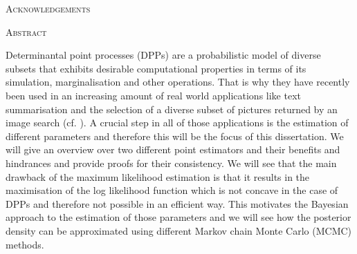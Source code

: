 \begin{center}
{\LARGE\textsc{Acknowledgements}\\[.9cm]}
\begin{minipage}{11cm}
\end{minipage}
\end{center}

\clearpage


\begin{center}
{\LARGE\textsc{Abstract}\\[.9cm]}
\begin{minipage}{11cm}
Determinantal point processes (DPPs) are a probabilistic model of diverse subsets that exhibits desirable computational properties in terms of its simulation, marginalisation and other operations. That is why they have recently been used in an increasing amount of real world applications like text summarisation and the selection of a diverse subset of pictures returned by an image search (cf. \cite{kulesza2012learning}). A crucial step in all of those applications is the estimation of different parameters and therefore this will be the focus of this dissertation. We will give an overview over two different point estimators and their benefits and hindrances and provide proofs for their consistency. We will see that the main drawback of the maximum likelihood estimation is that it results in the maximisation of the log likelihood function which is not concave in the case of DPPs and therefore not possible in an efficient way. This motivates the Bayesian approach to the estimation of those parameters and we will see how the posterior density can be approximated using different Markov chain Monte Carlo (MCMC) methods.
\end{minipage}
\end{center}


\clearpage
